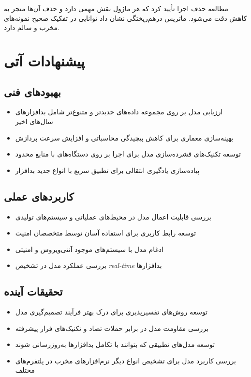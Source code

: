 \documentclass[a4paper,11pt]{article}
\begin{document}
مطالعه حذف اجزا تأیید کرد که هر ماژول نقش مهمی دارد و حذف آن‌ها منجر به کاهش دقت می‌شود. ماتریس درهم‌ریختگی نشان داد توانایی در تفکیک صحیح نمونه‌های مخرب و سالم دارد.

\section{پیشنهادات آتی}
\subsection{بهبودهای فنی}
\begin{itemize}
    \item ارزیابی مدل بر روی مجموعه داده‌های جدیدتر و متنوع‌تر شامل بدافزارهای سال‌های اخیر
    \item بهینه‌سازی معماری برای کاهش پیچیدگی محاسباتی و افزایش سرعت پردازش
    \item توسعه تکنیک‌های فشرده‌سازی مدل برای اجرا بر روی دستگاه‌های با منابع محدود
    \item پیاده‌سازی یادگیری انتقالی برای تطبیق سریع با انواع جدید بدافزار
\end{itemize}

\subsection{کاربردهای عملی}
\begin{itemize}
    \item بررسی قابلیت اعمال مدل در محیط‌های عملیاتی و سیستم‌های تولیدی
    \item توسعه رابط کاربری برای استفاده آسان توسط متخصصان امنیت
    \item ادغام مدل با سیستم‌های موجود آنتی‌ویروس و امنیتی
    \item بررسی عملکرد مدل در تشخیص \textit{real-time} بدافزارها
\end{itemize}

\subsection{تحقیقات آینده}
\begin{itemize}
    \item توسعه روش‌های تفسیرپذیری برای درک بهتر فرآیند تصمیم‌گیری مدل
    \item بررسی مقاومت مدل در برابر حملات تضاد و تکنیک‌های فرار پیشرفته
    \item توسعه مدل‌های تطبیقی که بتوانند با تکامل بدافزارها به‌روزرسانی شوند
    \item بررسی کاربرد مدل برای تشخیص انواع دیگر نرم‌افزارهای مخرب در پلتفرم‌های مختلف
\end{itemize}

\onecolumn
\newpage
\begin{latin}
  \printbibliography[heading=bibintoc,title={مراجع}]
\end{latin}
\end{document}
